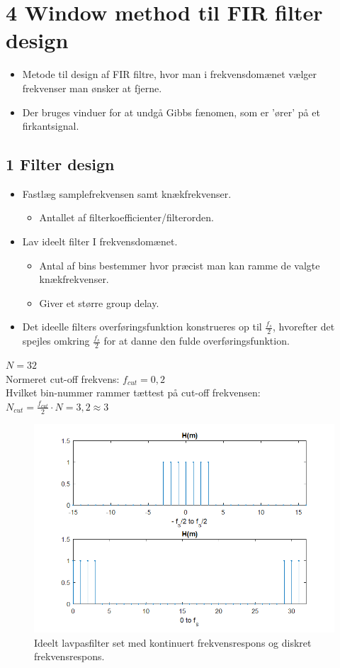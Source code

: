 \documentclass[danish]{article}
\begin{document}
\section*{4 Window method til FIR filter design}

\begin{itemize}
	\item Metode til design af FIR filtre, hvor man i frekvensdomænet vælger frekvenser man ønsker at fjerne.
	\item Der bruges vinduer for at undgå Gibbs fænomen, som er 'ører' på et firkantsignal.
\end{itemize}
\subsection*{1 Filter design}
\begin{itemize}
	\item Fastlæg samplefrekvensen samt knækfrekvenser.
	\begin{itemize}
		\item Antallet af filterkoefficienter/filterorden.
	\end{itemize}
	\item Lav ideelt filter I frekvensdomænet.
	\begin{itemize}
		\item Antal af bins bestemmer hvor præcist man kan ramme de valgte knækfrekvenser.
		\item Giver et større group delay. 
	\end{itemize}
	\item Det ideelle filters overføringsfunktion konstrueres op til $\frac{f_s}{2}$, hvorefter det spejles omkring $\frac{f_s}{2}$ for at danne den fulde overføringsfunktion. 
\end{itemize}

$N = 32$\\
\newline Normeret cut-off frekvens: $f_{cut} = 0,2$\\
\newline Hvilket bin-nummer rammer tættest på cut-off frekvensen: $N_{cut} = \frac{f_{cut}}{2}\cdot N = 3,2 \approx 3$\\

\begin{figure}[H]
	\centering
	\includegraphics[width=0.6\linewidth]{graphics/windowmethod_1}
	\caption{Ideelt lavpasfilter set med kontinuert frekvensrespons og diskret frekvensrespons.}
	\label{fig:windowmethod_1}
\end{figure}
\end{document}
